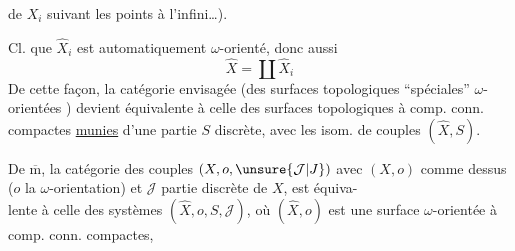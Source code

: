 de $X_i$ suivant les points à l'infini\ldots).

Cl. que $\widehat X_i$ est automatiquement $\omega$-orienté, donc aussi
\[
\widehat X=\coprod\widehat X_i
\]
De cette façon, la catégorie envisagée (des surfaces topologiques ``spéciales'' $\omega$-orientées ) devient équivalente à celle des surfaces topologiques  à comp. conn. compactes \uline{munies} d'une partie  $S$ discrète, avec les isom. de couples $(\widehat X,S)$.

De $\overline{\mathrm m}$, la catégorie des couples  $(X,o,\unsure{\mathcal J|J})$ avec $(X,o)$ comme dessus ($o$ la $\omega$-orientation) et $\mathcal J$ partie discrète de $X$, est équiva-\\
lente à celle des systèmes $(\widehat X,o,S,\mathcal J)$, où $(\widehat X,o)$ est une surface $\omega$-orientée à comp. conn. compactes,

